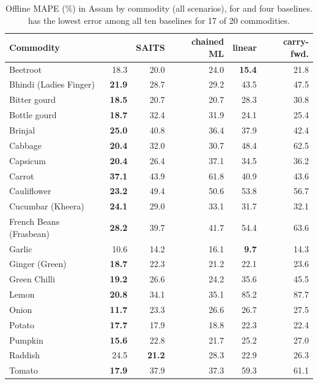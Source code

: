 \begin{table}[tbp]
\caption{Offline MAPE (\%) in Assam by commodity (all scenarios), for \auto{} and four baselines. \auto{} has the lowest error among all ten baselines for 17 of 20 commodities.}
\label{tab:commodity}
\footnotesize\setlength{\tabcolsep}{2.7pt}
\begin{tabular}{lrrrrr}
\toprule
Commodity & \auto{} & SAITS & chained ML & linear & carry-fwd. \\
\midrule
Beetroot & 18.3 & 20.0 & 24.0 & \textbf{15.4} & 21.8 \\
Bhindi (Ladies Finger) & \textbf{21.9} & 28.7 & 29.2 & 43.5 & 47.5 \\
Bitter gourd & \textbf{18.5} & 20.7 & 20.7 & 28.3 & 30.8 \\
Bottle gourd & \textbf{18.7} & 32.4 & 31.9 & 24.1 & 25.4 \\
Brinjal & \textbf{25.0} & 40.8 & 36.4 & 37.9 & 42.4 \\
Cabbage & \textbf{20.4} & 32.0 & 30.7 & 48.4 & 62.5 \\
Capsicum & \textbf{20.4} & 26.4 & 37.1 & 34.5 & 36.2 \\
Carrot & \textbf{37.1} & 43.9 & 61.8 & 40.9 & 43.6 \\
Cauliflower & \textbf{23.2} & 49.4 & 50.6 & 53.8 & 56.7 \\
Cucumbar (Kheera) & \textbf{24.1} & 29.0 & 33.1 & 31.7 & 32.1 \\
French Beans (Frasbean) & \textbf{28.2} & 39.7 & 41.7 & 54.4 & 63.6 \\
Garlic & 10.6 & 14.2 & 16.1 & \textbf{9.7} & 14.3 \\
Ginger (Green) & \textbf{18.7} & 22.3 & 21.2 & 22.1 & 23.6 \\
Green Chilli & \textbf{19.2} & 26.6 & 24.2 & 35.6 & 45.5 \\
Lemon & \textbf{20.8} & 34.1 & 35.1 & 85.2 & 87.7 \\
Onion & \textbf{11.7} & 23.3 & 26.6 & 26.7 & 27.5 \\
Potato & \textbf{17.7} & 17.9 & 18.8 & 22.3 & 22.4 \\
Pumpkin & \textbf{15.6} & 22.8 & 21.7 & 25.2 & 27.0 \\
Raddish & 24.5 & \textbf{21.2} & 28.3 & 22.9 & 26.3 \\
Tomato & \textbf{17.9} & 37.9 & 37.3 & 59.3 & 61.1 \\
\bottomrule
\end{tabular}
\end{table}
